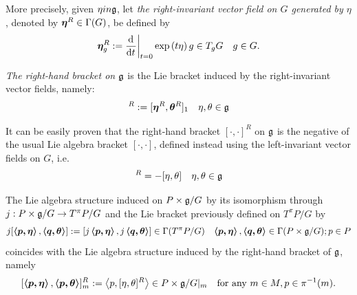 \begin{definition}
 More precisely, given $\eta in \mathfrak{g}$, let \emph{the right-invariant vector field on $G$ generated by $\eta$}, denoted by $\bm{\eta}^R \in \Gamma(G)$, be defined by
\begin{align}
    \sect \eta^R_g := \der{}{t}[t = 0] \exp{(t \eta)}\, g \in T_g G && g \in G.
\end{align}

\emph{The right-hand bracket on $\mathfrak{g}$} is the Lie bracket induced by the right-invariant vector fields, namely:
\begin{align}
    [\eta, \theta]^R := [\sect \eta^R, \sect \theta^R]_1 && \eta, \theta \in \alg g
\end{align}
\end{definition}

It can be easily proven that the right-hand bracket $[\cdot, \cdot]^R$ on $\mathfrak{g}$ is the negative of the usual Lie algebra bracket $[\cdot, \cdot]$, defined instead using the left-invariant vector fields on $G$, i.e.
\begin{align}
    [\eta, \theta]^R = -[\eta, \theta] && \eta, \theta \in \alg g
\end{align}

\begin{theorem}\label{theoBracketAdjoint}
The Lie algebra structure induced on $P \times \mathfrak{g}/G$ by its isomorphism through $j: P \times \mathfrak{g}/G \to T^\pi P/G$ and the Lie bracket previously defined on $T^\pi P/G$ by
\begin{align} \label{eqnBraIndTpi}
    j[\bm{\left\langle p, \eta \right\rangle}, \bm{\left\langle q, \theta \right\rangle}] := [j\bm{\left\langle p, \eta \right\rangle}, j\bm{\left\langle q, \theta \right\rangle}] \in \Gamma(T^\pi P/G) && \bm{\left\langle p, \eta \right\rangle}, \bm{\left\langle q, \theta \right\rangle} \in \Gamma(P \times \mathfrak{g}/G); p \in P
\end{align}
coincides with the Lie algebra structure induced by the right-hand bracket of $\mathfrak{g}$, namely
\begin{align} \label{eqnBraIndg}
    [\bm{\left\langle p, \eta \right\rangle}, \bm{\left\langle p, \theta \right\rangle}]^R_m := \left\langle p, [\eta, \theta]^R \right\rangle \in P \times \mathfrak{g}/G|_m && \textrm{for any } m \in M, p \in \pi^{-1}(m).
\end{align}
\end{theorem}

